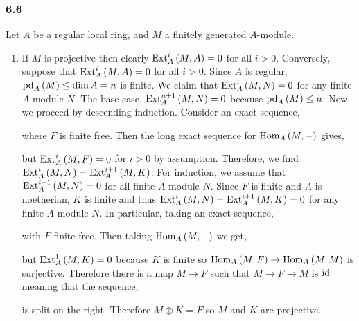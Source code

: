 \documentclass[12pt]{article}
\begin{document}
\subsubsection{6.6}

Let $A$ be a regular local ring, and $M$ a finitely generated $A$-module. 

\begin{enumerate}
\item If $M$ is projective then clearly $\mathrm{Ext}^{i}_{A} \left( M, A \right) = 0$ for all $i > 0$. Conversely, suppose that $\mathrm{Ext}^{i}_{A} \left( M, A \right) = 0$ for all $i > 0$. Since $A$ is regular, $\mathrm{pd}_{A}\left(M \right) \le \dim{A} = n$ is finite. We claim that $\mathrm{Ext}^{i}_{A} \left( M, N \right) = 0$ for any finite $A$-module $N$. The base case, $\mathrm{Ext}^{n+1}_{A} \left( M, N \right) = 0$ because $\mathrm{pd}_{A}\left(M \right) \le n$. Now we proceed by descending induction. Consider an exact sequence,
\begin{center}
\end{center}
where $F$ is finite free. Then the long exact sequence for $\mathrm{Hom}_{A} \left( M, - \right)$ gives,
\begin{center}
\end{center}
but $\mathrm{Ext}^{i}_{A} \left( M, F \right) = 0$ for $i > 0$ by assumption. Therefore, we find $\mathrm{Ext}^{i}_{A} \left( M, N \right) = \mathrm{Ext}^{i+1}_{A} \left( M, K \right)$. For induction, we assume that $\mathrm{Ext}^{i+1}_{A} \left( M, N \right) = 0$ for all finite $A$-module $N$. Since $F$ is finite and $A$ is noetherian, $K$ is finite and thus $\mathrm{Ext}^{i}_{A} \left( M, N \right) = \mathrm{Ext}^{i+1}_{A} \left( M, K \right) = 0$ for any finite $A$-module $N$. In particular, taking an exact sequence,
\begin{center}
\end{center}
with $F$ finite free. Then taking $\mathrm{Hom}_{A} \left( M, - \right)$ we get,
\begin{center}
\end{center}
but $\mathrm{Ext}^{1}_{A} \left( M, K \right) = 0$ because $K$ is finite so $\mathrm{Hom}_{A} \left( M, F \right) \to \mathrm{Hom}_{A} \left( M, M \right)$ is surjective. Therefore there is a map $M \to F$ such that $M \to F \to M$ is $\mathrm{id}$ meaning that the sequence,
\begin{center}
\end{center}
is split on the right. Therefore $M \oplus K = F$ so $M$ and $K$ are projective.


\end{enumerate}
\end{document}
